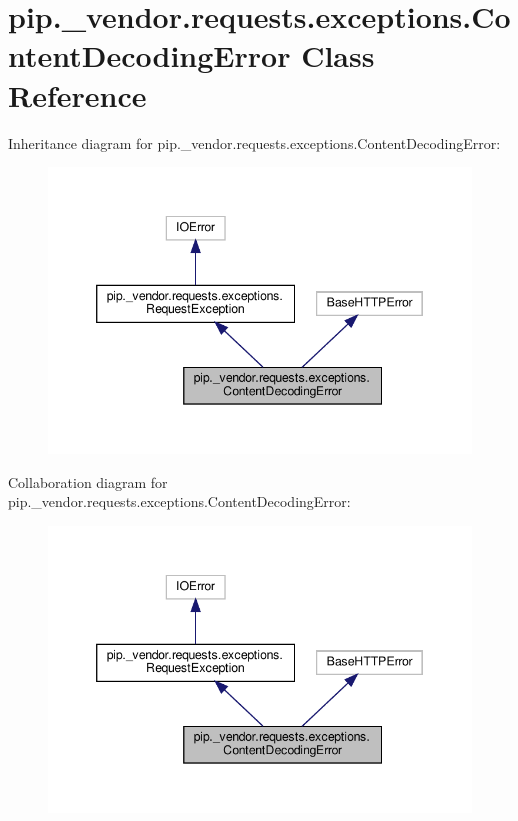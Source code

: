 \hypertarget{classpip_1_1__vendor_1_1requests_1_1exceptions_1_1ContentDecodingError}{}\section{pip.\+\_\+vendor.\+requests.\+exceptions.\+Content\+Decoding\+Error Class Reference}
\label{classpip_1_1__vendor_1_1requests_1_1exceptions_1_1ContentDecodingError}


Inheritance diagram for pip.\+\_\+vendor.\+requests.\+exceptions.\+Content\+Decoding\+Error\+:
\nopagebreak
\begin{figure}[H]
\begin{center}
\leavevmode
\includegraphics[width=346pt]{classpip_1_1__vendor_1_1requests_1_1exceptions_1_1ContentDecodingError__inherit__graph}
\end{center}
\end{figure}


Collaboration diagram for pip.\+\_\+vendor.\+requests.\+exceptions.\+Content\+Decoding\+Error\+:
\nopagebreak
\begin{figure}[H]
\begin{center}
\leavevmode
\includegraphics[width=346pt]{classpip_1_1__vendor_1_1requests_1_1exceptions_1_1ContentDecodingError__coll__graph}
\end{center}
\end{figure}

